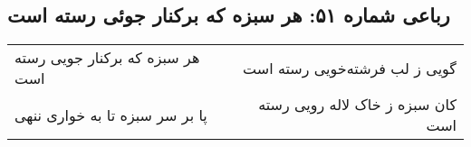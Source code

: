 \begin{center}
\section*{رباعی شماره ۵۱: هر سبزه که برکنار جوئی رسته است}
\label{sec:sh051}
\begin{longtable}{l p{0.5cm} r}
هر سبزه که برکنار جویی رسته است
&&
گویی ز لب فرشته‌خویی رسته است
\\
پا بر سر سبزه تا به خواری ننهی
&&
کان سبزه ز خاک لاله رویی رسته است
\\
\end{longtable}
\end{center}
